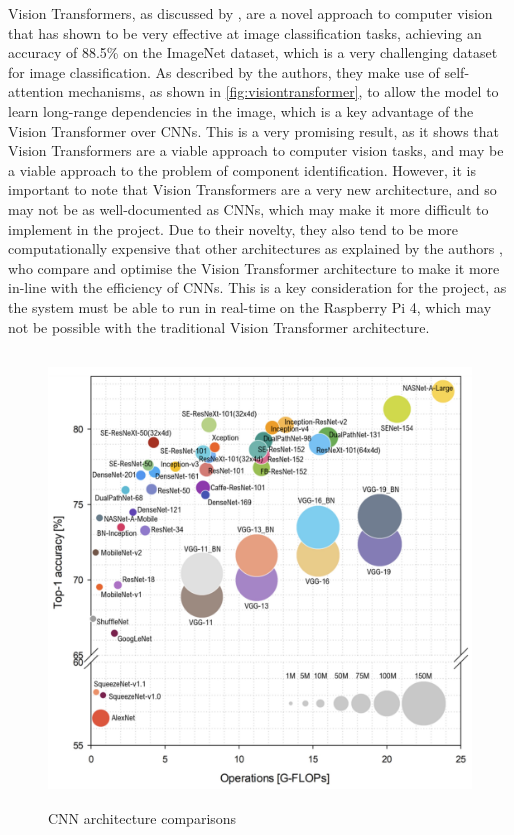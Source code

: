 Vision Transformers, as discussed by \citet{dosovitskiy2021image}, are a novel approach to computer vision that has shown to be very effective at image classification tasks, achieving an accuracy of 88.5\% on the ImageNet dataset, which is a very challenging dataset for image classification. As described by the authors, they make use of self-attention mechanisms, as shown in \autoref{fig:visiontransformer}, to allow the model to learn long-range dependencies in the image, which is a key advantage of the Vision Transformer over CNNs. This is a very promising result, as it shows that Vision Transformers are a viable approach to computer vision tasks, and may be a viable approach to the problem of component identification. However, it is important to note that Vision Transformers are a very new architecture, and so may not be as well-documented as CNNs, which may make it more difficult to implement in the project. Due to their novelty, they also tend to be more computationally expensive that other architectures as explained by the authors \citet{li2022efficientformer}, who compare and optimise the Vision Transformer architecture to make it more in-line with the efficiency of CNNs. This is a key consideration for the project, as the system must be able to run in real-time on the Raspberry Pi 4, which may not be possible with the traditional Vision Transformer architecture.

\begin{figure}[H]
  \hfill
  \begin{minipage}[t]{\textwidth}
    \centering
    \includegraphics[height=12cm]{imgs/articles/cnncomparison.jpg}
    \caption{CNN architecture comparisons \cite{electronics11060945}}
    \label{fig:cnncomparison}
  \end{minipage}
\end{figure}

